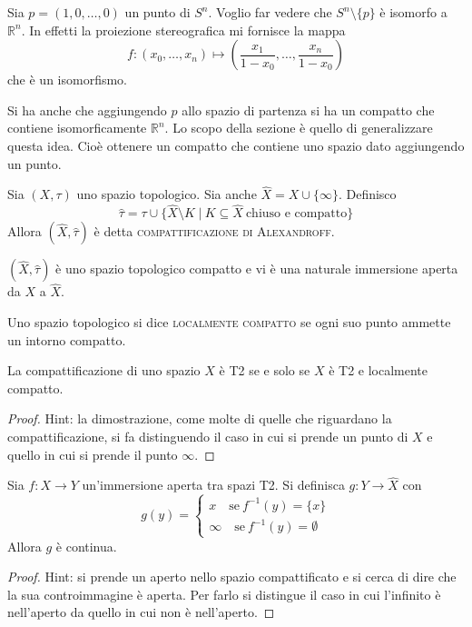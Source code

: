 \begin{ex}
    Sia $p=(1,0,\dots,0)$ un punto di $S^n$. Voglio far vedere che $S^n\setminus\{p\}$ \`e isomorfo a $\mathbb{R}^n$. In effetti la proiezione stereografica mi fornisce la mappa
    \[
        f\colon(x_0, \dots, x_n)\mapsto(\frac{x_1}{1-x_0}, \dots, \frac{x_n}{1-x_0})
    \]
    che \`e un isomorfismo.

    Si ha anche che aggiungendo $p$ allo spazio di partenza si ha un compatto che contiene isomorficamente $\mathbb{R}^n$. Lo scopo della sezione \`e quello di generalizzare questa idea. Cio\`e ottenere un compatto che contiene uno spazio dato aggiungendo un punto.
\end{ex}

\begin{defn}
    Sia $(X,\tau)$ uno spazio topologico. Sia anche $\hat{X} = X \cup \{\infty\}$. Definisco
    \[
        \hat{\tau} = \tau \cup \{\hat{X}\setminus K\; |\ K \subseteq \hat{X}\  \text{chiuso e compatto}\}
    \]
    Allora $(\hat{X}, \hat{\tau})$ \`e detta \textsc{compattificazione di Alexandroff}.
\end{defn}

\begin{oss}
    $(\hat{X}, \hat{\tau})$ \`e uno spazio topologico compatto e vi \`e una naturale immersione aperta da $X$ a $\hat{X}$.
\end{oss}

\begin{defn}
    Uno spazio topologico si dice \textsc{localmente compatto} se ogni suo punto ammette un intorno compatto.
\end{defn}

\begin{prop}
    La compattificazione di uno spazio $X$ \`e T2 se e solo se $X$ \`e T2 e localmente compatto.
\end{prop}
\begin{proof}
    Hint: la dimostrazione, come molte di quelle che riguardano la compattificazione, si fa distinguendo il caso in cui si prende un punto di $X$ e quello in cui si prende il punto $\infty$.
\end{proof}

\begin{prop}
    Sia $f\colon X \longrightarrow Y$ un'immersione aperta tra spazi T2. Si definisca $g\colon Y \longrightarrow \hat{X}$ con
    \[
        g(y) =
        \begin{cases}
            x\quad \text{se}\ f^{-1}(y) = \{x\}\\
            \infty \quad\text{se}\ f^{-1}(y) = \emptyset
        \end{cases}
    \]
    Allora $g$ \`e continua.
\end{prop}
\begin{proof}
    Hint: si prende un aperto nello spazio compattificato e si cerca di dire che la sua controimmagine \`e aperta. Per farlo si distingue il caso in cui l'infinito \`e nell'aperto da quello in cui non \`e nell'aperto.
\end{proof}

